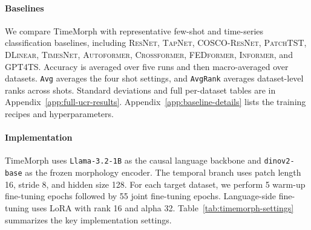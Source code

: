 \documentclass[10pt,journal,compsoc]{IEEEtran}
\begin{document}
\paragraph{Baselines}
We compare TimeMorph with representative few-shot and time-series classification baselines, including \textsc{ResNet}, \textsc{TapNet}, \textsc{COSCO-ResNet}, \textsc{PatchTST}, \textsc{DLinear}, \textsc{TimesNet}, \textsc{Autoformer}, \textsc{Crossformer}, \textsc{FEDformer}, \textsc{Informer}, and \textsc{GPT4TS}.  Accuracy is averaged over five runs and then macro-averaged over datasets. \texttt{Avg} averages the four shot settings, and \texttt{AvgRank} averages dataset-level ranks across shots. Standard deviations and full per-dataset tables are in Appendix~\ref{app:full-ucr-results}.  Appendix~\ref{app:baseline-details} lists the training recipes and hyperparameters.

\paragraph{Implementation}
TimeMorph uses \texttt{Llama-3.2-1B} as the causal language backbone and \texttt{dinov2-base} as the frozen morphology encoder.
The temporal branch uses patch length 16, stride 8, and hidden size 128.
For each target dataset, we perform 5 warm-up fine-tuning epochs followed by 55 joint fine-tuning epochs.
Language-side fine-tuning uses LoRA with rank 16 and alpha 32.
Table~\ref{tab:timemorph-settings} summarizes the key implementation settings.
\end{document}
